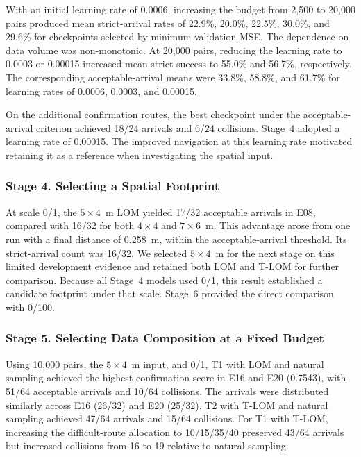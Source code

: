 \documentclass[robotics,article,submit,pdftex,moreauthors]{Definitions/mdpi}
\begin{document}
With an initial learning rate of 0.0006, increasing the budget from 2,500 to 20,000 pairs produced mean strict-arrival rates of 22.9\%, 20.0\%, 22.5\%, 30.0\%, and 29.6\% for checkpoints selected by minimum validation MSE. The dependence on data volume was non-monotonic. At 20,000 pairs, reducing the learning rate to 0.0003 or 0.00015 increased mean strict success to 55.0\% and 56.7\%, respectively. The corresponding acceptable-arrival means were 33.8\%, 58.8\%, and 61.7\% for learning rates of 0.0006, 0.0003, and 0.00015.

On the additional confirmation routes, the best checkpoint under the acceptable-arrival criterion achieved 18/24 arrivals and 6/24 collisions. Stage~4 adopted a learning rate of 0.00015. The improved navigation at this learning rate motivated retaining it as a reference when investigating the spatial input.

\subsubsection{Stage 4. Selecting a Spatial Footprint}\label{subsec:stage4_results}

At scale 0/1, the $5\times4$~m LOM yielded 17/32 acceptable arrivals in E08, compared with 16/32 for both $4\times4$ and $7\times6$~m. This advantage arose from one run with a final distance of 0.258~m, within the acceptable-arrival threshold. Its strict-arrival count was 16/32. We selected $5\times4$~m for the next stage on this limited development evidence and retained both LOM and T-LOM for further comparison. Because all Stage~4 models used 0/1, this result established a candidate footprint under that scale. Stage~6 provided the direct comparison with 0/100.

\subsubsection{Stage 5. Selecting Data Composition at a Fixed Budget}\label{subsec:stage5_results}

Using 10,000 pairs, the $5\times4$~m input, and 0/1, T1 with LOM and natural sampling achieved the highest confirmation score in E16 and E20 (0.7543), with 51/64 acceptable arrivals and 10/64 collisions. The arrivals were distributed similarly across E16 (26/32) and E20 (25/32). T2 with T-LOM and natural sampling achieved 47/64 arrivals and 15/64 collisions. For T1 with T-LOM, increasing the difficult-route allocation to 10/15/35/40 preserved 43/64 arrivals but increased collisions from 16 to 19 relative to natural sampling.
\end{document}
